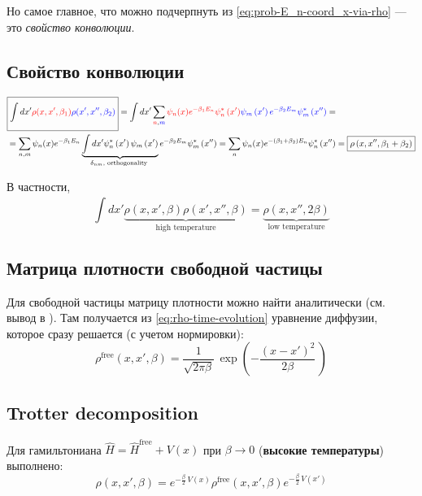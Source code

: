 \begin{lecture}
Но самое главное, что можно подчерпнуть из \eqref{eq:prob-E_n-coord_x-via-rho} --- это \textit{свойство конволюции}.
\subsection{Свойство конволюции}
\begin{align}
    \label{eq:rho_convolution-derivation}
    \nonumber
    & \boxed{\int\limits_{}^{} dx' {\color{red}\rho(x, x', \beta_1)} {\color{blue}\rho(x', x'', \beta_2)}} =
    \int d x^{\prime} \sum_{{\color{red}n}, {\color{blue}m}} 
    {\color{red}\psi_{n}(x) e^{-\beta_{1} E_{n}} \psi_{n}^{*}\left(x^{\prime}\right)} 
    {\color{blue} \psi_{m}\left(x^{\prime}\right) e^{-\beta_{2} E_{m}} \psi_{m}^{*}\left(x^{\prime \prime}\right)} = \\
    & = \sum_{n, m} \psi_{n}(x) e^{-\beta_{1} E_{n}} \underbrace{\int d x^{\prime} \psi_{n}^{*}\left(x^{\prime}\right) \psi_{m}\left(x^{\prime}\right)}_{\delta_{n m}, \text { orthogonality }} e^{-\beta_{2} E_{m}} \psi_{m}^{*}\left(x^{\prime \prime}\right) = \sum_{n} \psi_{n}(x) e^{-\left(\beta_{1}+\beta_{2}\right) E_{n}} \psi_{n}^{*}\left(x^{\prime \prime}\right) =
    \boxed{\rho\left(x, x^{\prime \prime}, \beta_{1}+\beta_{2}\right)}
\end{align}

В частности,
\begin{equation}
    \label{eq:rho_convolution-2beta}
    \int\limits_{}^{} dx' \underbrace{\rho(x, x', \beta) \rho(x', x'', \beta)}_\text{high temperature} =
    \underbrace{\rho (x, x'', 2\beta)}_\text{low temperature}
\end{equation}

\subsection{Матрица плотности свободной частицы}
Для свободной частицы матрицу плотности можно найти аналитически (см. вывод в \cite{feynman}).
Там получается из \eqref{eq:rho-time-evolution} уравнение диффузии, которое сразу решается (с учетом нормировки):
\begin{equation}
    \label{eq:rho-free-particle}
    \rho^\text{free} (x, x', \beta) = \frac{1}{\sqrt{2\pi \beta}}\, \exp \left( -\frac{(x - x')^2}{2\beta}\, \right)  
\end{equation}

\subsection{Trotter decomposition}
Для гамильтониана $\hat{H} = \hat{H}^{\text{free}} + V(x)$ при $\beta \rightarrow 0$ (\textbf{высокие температуры}) выполнено:
\begin{equation}
    \label{eq:trotter-decomposition-definition}
    \rho (x, x', \beta) = e^{- \frac{\beta}{2}\, V(x)} \rho^{\text{free}} (x, x', \beta) e^{- \frac{\beta}{2}\, V(x')} 
\end{equation}


\end{lecture}
